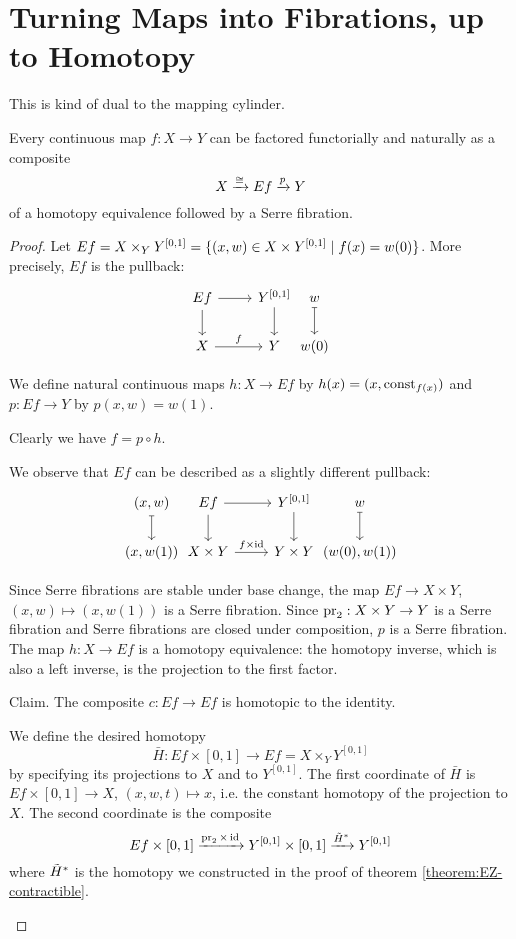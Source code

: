 \section{Turning Maps into Fibrations, up to Homotopy}

This is kind of dual to the mapping cylinder.

\begin{theorem}
Every continuous map $f:X\to Y$ can be factored functorially and naturally as a composite
\[X\xrightarrow{\cong}Ef\xrightarrow{p} Y\]
of a homotopy equivalence followed by a Serre fibration.
\end{theorem}

\begin{proof}
Let $Ef=X\times_Y Y^{[0,1]}=\{(x,w)\in X\times Y^{[0,1]}\mid f(x)=w(0)\}$. More precisely, $Ef$ is the pullback:
\[\begin{tikzcd}
Ef \arrow[d] \arrow[r] & Y^{[0,1]} \arrow[d] &[-6ex] w \ar[d,mapsto] \\
X \arrow[r,"f"] & Y & w(0)
\end{tikzcd}\]

We define natural continuous maps $h:X\to Ef$ by $h(x)=(x,\operatorname{const}_{f(x)})$ and $p:Ef\to Y$ by $p(x,w)=w(1)$.

Clearly we have $f=p\circ h$.

We observe that $Ef$ can be described as a slightly different pullback:
\[\begin{tikzcd}
(x,w) \ar[d,mapsto] &[-6ex] Ef \arrow[d] \arrow[r] & Y^{[0,1]} \arrow[d] &[-6ex] w \ar[d,mapsto]\\
(x,w(1)) & X\times Y \arrow[r,"f\times\id"] & Y\times Y & (w(0),w(1))
\end{tikzcd}\]

Since Serre fibrations are stable under base change, the map $Ef\to X\times Y$, $(x,w)\mapsto(x,w(1))$ is a Serre fibration. Since $\operatorname{pr}_2:X\times Y\to Y$ is a Serre fibration and Serre fibrations are closed under composition, $p$ is a Serre fibration. 
The map $h:X\to Ef$ is a homotopy equivalence: the homotopy inverse, which is also a left inverse, is the projection to the first factor.

Claim. The composite $c:Ef\to Ef$ is homotopic to the identity.

\begin{claimproof}
We define the desired homotopy
\[\bar H:Ef\times[0,1]\to Ef=X\times_Y Y^{[0,1]}\]
by specifying its projections to $X$ and to $Y^{[0,1]}$. The first coordinate of $\bar H$ is $Ef\times[0,1]\to X$, $(x,w,t)\mapsto x$, i.e. the constant homotopy of the projection to $X$. The second coordinate is the composite
\[Ef\times[0,1]\xrightarrow{\operatorname{pr}_2\times\operatorname{id}} Y^{[0,1]}\times [0,1]\xrightarrow{\tilde H^*} Y^{[0,1]}\]
where $\tilde H^*$ is the homotopy we constructed in the proof of theorem \ref{theorem:EZ-contractible}.


\end{claimproof}
\end{proof}
